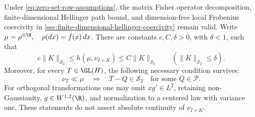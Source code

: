 \begin{proposition}
\label{prop:local-coercivity-with-density-zeros}
Under \eqref{eq:zero-set-row-assumptions}, the matrix Fisher operator decomposition,
finite-dimensional Hellinger path bound, and dimension-free local
Frobenius coercivity in \cref{sec:finite-dimensional-hellinger-coercivity} remain valid.
Write \(\mu=\rho^{\otimes\N},\quad\rho(dx)=f(x)\,dx\).
There are constants \(c,C,\delta>0\), with \(\delta<1\), such that
\begin{equation}
 c\|K\|_{\mathcal S_2}\leq h(\mu,\nu_{I+K})
       \leq C\|K\|_{\mathcal S_2}
 \qquad(\|K\|_{\mathcal S_2}\leq\delta).
 \label{eq:local-hs-bound-with-density-zeros}
\end{equation}
Moreover, for every \(T\in\GL(H)\), the following necessary
condition survives:
\begin{equation}
 \nu_T\ll\mu
 \quad\Longrightarrow\quad
 T-Q\in\mathcal S_2
 \quad\text{for some }Q\in\mathcal P.
 \label{eq:hs-necessity-with-density-zeros}
\end{equation}
For orthogonal transformations one may omit \(xg'\in L^2\),
retaining non-Gaussianity, \(g\in W^{1,2}(\R)\), and normalization to a
centered law with variance one.
These statements do not assert absolute continuity of
\(\nu_{I+K}\).
\end{proposition}

